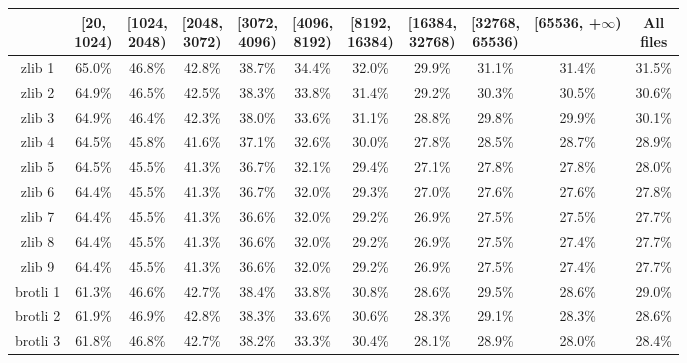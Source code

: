 \documentclass[12pt]{article}
\begin{document}
\begin{table}[H]
\centering
\begin{threeparttable}
\begin{tabular}{ccccccccccc}
  \toprule
  \thead{} & \thead{[20,\\ 1024)} & \thead{[1024,\\ 2048)} & \thead{[2048,\\ 3072)}
           & \thead{[3072,\\ 4096)} & \thead{[4096,\\ 8192)} & \thead{[8192,\\ 16384)}
           & \thead{[16384,\\ 32768)} & \thead{[32768,\\ 65536)}
           & \thead{[65536,\\ +$\infty$)} & \thead{All \\ files} \\
  \midrule
  zlib 1 & 65.0\% & 46.8\% & 42.8\% & 38.7\% & 34.4\% & 32.0\% & 29.9\% & 31.1\% & 31.4\% & 31.5\% \\
  zlib 2 & 64.9\% & 46.5\% & 42.5\% & 38.3\% & 33.8\% & 31.4\% & 29.2\% & 30.3\% & 30.5\% & 30.6\% \\
  zlib 3 & 64.9\% & 46.4\% & 42.3\% & 38.0\% & 33.6\% & 31.1\% & 28.8\% & 29.8\% & 29.9\% & 30.1\% \\
  zlib 4 & 64.5\% & 45.8\% & 41.6\% & 37.1\% & 32.6\% & 30.0\% & 27.8\% & 28.5\% & 28.7\% & 28.9\% \\
  zlib 5 & 64.5\% & 45.5\% & 41.3\% & 36.7\% & 32.1\% & 29.4\% & 27.1\% & 27.8\% & 27.8\% & 28.0\% \\
  zlib 6 & 64.4\% & 45.5\% & 41.3\% & 36.7\% & 32.0\% & 29.3\% & 27.0\% & 27.6\% & 27.6\% & 27.8\% \\
  zlib 7 & 64.4\% & 45.5\% & 41.3\% & 36.6\% & 32.0\% & 29.2\% & 26.9\% & 27.5\% & 27.5\% & 27.7\% \\
  zlib 8 & 64.4\% & 45.5\% & 41.3\% & 36.6\% & 32.0\% & 29.2\% & 26.9\% & 27.5\% & 27.4\% & 27.7\% \\
  zlib 9 & 64.4\% & 45.5\% & 41.3\% & 36.6\% & 32.0\% & 29.2\% & 26.9\% & 27.5\% & 27.4\% & 27.7\% \\
  brotli 1 & 61.3\% & 46.6\% & 42.7\% & 38.4\% & 33.8\% & 30.8\% & 28.6\% & 29.5\% & 28.6\% & 29.0\% \\
  brotli 2 & 61.9\% & 46.9\% & 42.8\% & 38.3\% & 33.6\% & 30.6\% & 28.3\% & 29.1\% & 28.3\% & 28.6\% \\
  brotli 3 & 61.8\% & 46.8\% & 42.7\% & 38.2\% & 33.3\% & 30.4\% & 28.1\% & 28.9\% & 28.0\% & 28.4\% \\

\end{tabular}
\end{threeparttable}
\end{table}
\end{document}
